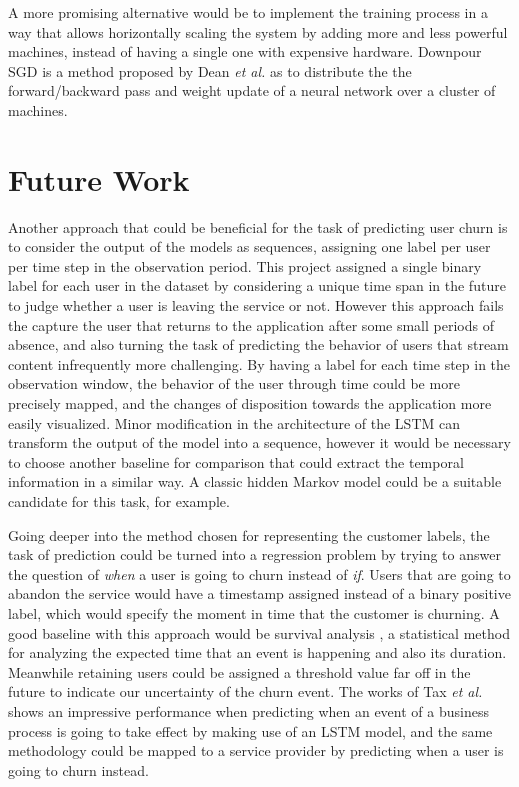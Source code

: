 \documentclass{kththesis}
\begin{document}
A more promising alternative would be to implement the training process in a way that allows horizontally scaling the system by adding more and less powerful machines, instead of having a single one with expensive hardware. Downpour SGD is a method proposed by Dean \emph{et al.} \citep{dean2012large} as to distribute the the forward/backward pass and weight update of a neural network over a cluster of machines.

\section{Future Work}
\label{sec:future_work}

Another approach that could be beneficial for the task of predicting user churn is to consider the output of the models as sequences, assigning one label per user per time step in the observation period. This project assigned a single binary label for each user in the dataset by considering a unique time span in the future to judge whether a user is leaving the service or not. However this approach fails the capture the user that returns to the application after some small periods of absence, and also turning the task of predicting the behavior of users that stream content infrequently more challenging. By having a label for each time step in the observation window, the behavior of the user through time could be more precisely mapped, and the changes of disposition towards the application more easily visualized. Minor modification in the architecture of the LSTM can transform the output of the model into a sequence, however it would be necessary to choose another baseline for comparison that could extract the temporal information in a similar way. A classic hidden Markov model could be a suitable candidate for this task, for example. 

Going deeper into the method chosen for representing the customer labels, the task of prediction could be turned into a regression problem by trying to answer the question of \emph{when} a user is going to churn instead of \emph{if}. Users that are going to abandon the service would have a timestamp assigned instead of a binary positive label, which would specify the moment in time that the customer is churning. A good baseline with this approach would be survival analysis \citep{ibrahim2005bayesian}, a statistical method for analyzing the expected time that an event is happening and also its duration. Meanwhile retaining users could be assigned a threshold value far off in the future to indicate our uncertainty of the churn event. The works of Tax \emph{et al.} \citep{Tax2016} shows an impressive performance when predicting when an event of a business process is going to take effect by making use of an LSTM model, and the same methodology could be mapped to a service provider by predicting when a user is going to churn instead. 
\end{document}
